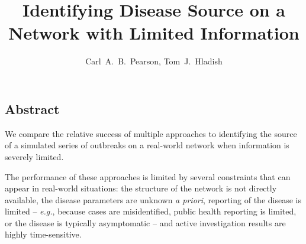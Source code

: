\documentclass{article}
\author{Carl~A.~B.~Pearson, Tom~J.~Hladish}
\begin{document}

\title{Identifying Disease Source on a Network with Limited Information}

\maketitle
\begin{centering}
\section*{Abstract}
\end{centering}
We compare the relative success of multiple approaches to identifying the source of a simulated series of outbreaks on a real-world network when information is severely limited.

The performance of these approaches is limited by several constraints that can appear in real-world situations: the structure of the network is not directly available, the disease parameters are unknown {\em a priori}, reporting of the disease is limited -- {\em e.g.}, because cases are misidentified, public health reporting is limited, or the disease is typically asymptomatic -- and active investigation results are highly time-sensitive.


% 
\end{document}
